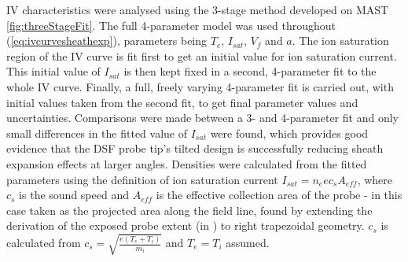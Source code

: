 \documentclass[a4paper, 11pt]{article} %
\begin{document}
	IV characteristics were analysed using the 3-stage method developed on MAST \cref{fig:threeStageFit}.
	The full 4-parameter model was used throughout (\cref{eq:ivcurvesheathexp}), parameters being $T_e$, $I_{sat}$, $V_f$ and $a$.
	The ion saturation region of the IV curve is fit first to get an initial value for ion saturation current.
	This initial value of $I_{sat}$ is then kept fixed in a second, 4-parameter fit to the whole IV curve. 
	Finally, a full, freely varying 4-parameter fit is carried out, with initial values taken from the second fit, to get final parameter values and uncertainties.
	Comparisons were made between a 3- and 4-parameter fit and only small differences in the fitted value of $I_{sat}$ were found, which provides good evidence that the DSF probe tip's tilted design is successfully reducing sheath expansion effects at larger angles.
	Densities were calculated from the fitted parameters using the definition of ion saturation current $I_{sat} = n_e e c_s A_{eff}$, 
	where $c_s$ is the sound speed and $A_{eff}$ is the effective collection area of the probe - in this case taken as the projected area along the field line, found by extending the derivation of the exposed probe extent (in \cite{Harrison}) to right trapezoidal geometry.
	$c_s$ is calculated from $c_s = \sqrt{\frac{e(T_e + T_i)}{m_i}}$ and $T_e = T_i$ assumed. 
\end{document}
